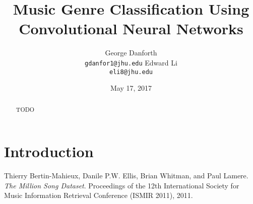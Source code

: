 \documentclass{article} %
\title{Music Genre Classification Using Convolutional Neural Networks}
\author{
George Danforth \\
\texttt{gdanfor1@jhu.edu}
\And\-Edward Li \\
\texttt{eli8@jhu.edu}
}
\date{May 17, 2017}
\begin{document}
\maketitle

\begin{abstract}
TODO
\end{abstract}

\section{Introduction}

\begin{thebibliography}{10}
Thierry Bertin-Mahieux, Danile P.W. Ellis, Brian Whitman, and Paul Lamere.
\textit{The Million Song Dataset}.
Proceedings of the 12th International Society for Music Information Retrieval Conference (ISMIR 2011), 2011.
\end{thebibliography}
\end{document}
